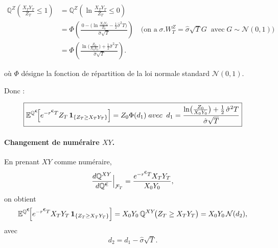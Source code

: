 \begin{align*}
\mathbb{Q}^{Z}\!\left(\frac{X_TY_T}{Z_T}\le 1\right)
&= \mathbb{Q}^{Z}\!\left(\ln\!\frac{X_TY_T}{Z_T}\le 0\right) \\
&= \Phi\!\left(\frac{\,0-\Big(\ln\!\frac{X_0Y_0}{Z_0}-\tfrac12\hat{\sigma}^2T\Big)}{\hat{\sigma}\sqrt{T}}\right)\quad \big( \text{on a} \; \sigma.W^Z_T = \hat{\sigma} \sqrt{T} G \; \; \text{avec} \; G \sim \mathcal{N}(0,1) \big) \\
&= \Phi\!\left(\frac{\ln\!\big(\tfrac{Z_0}{X_0Y_0}\big)+\tfrac12\hat{\sigma}^2T}{\hat{\sigma}\sqrt{T}}\right).
\end{align*}

où \(\Phi\) désigne la fonction de répartition de la loi normale standard \(\mathcal{N}(0,1)\).

Donc : 

\[
\boxed{
\mathbb{E}^{\mathbb{Q}^{\EUR}}\!\Big[e^{-r^{\EUR}T} Z_T\,\mathbf{1}_{\{Z_T\ge X_TY_T\}}\Big] = Z_0\Phi(d_1) \; avec \; \; d_1=\frac{\ln\!\big(\tfrac{Z_0}{X_0Y_0}\big)+\tfrac12\,\hat{\sigma}^2 T}{\hat{\sigma}\sqrt{T}}
}\]





\paragraph{Changement de numéraire $XY$.}
En prenant $XY$ comme numéraire,
\[
\frac{d\mathbb{Q}^{XY}}{d\mathbb{Q}^{\EUR}}\Big|_{\mathcal{F}_T}
=\frac{e^{-r^{\EUR}T}X_TY_T}{X_0Y_0},
\]
on obtient
\begin{align*}
\mathbb{E}^{\mathbb{Q}^{\EUR}}\!\Big[e^{-r^{\EUR}T} X_TY_T\,\mathbf{1}_{\{Z_T\ge X_TY_T\}}\Big]
= X_0Y_0\,\mathbb{Q}^{XY}\!\big(Z_T\ge X_TY_T\big)
= X_0Y_0\,\mathcal{N}(d_2),
\end{align*}
avec
\[
d_2 = d_1 - \hat{\sigma}\sqrt{T}.
\]


